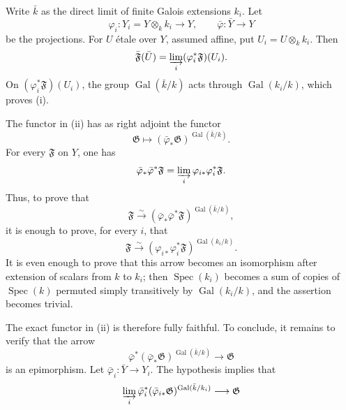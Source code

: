 Write $\bar k$ as the direct limit of finite Galois extensions $k_i$.
Let
\begin{equation*}
\varphi_i:Y_i=Y\otimes_k k_i\longrightarrow Y,
\qquad
\bar\varphi:\bar Y\longrightarrow Y
\end{equation*}
be the projections.  For $U$ \'{e}tale over $Y$, assumed affine, put
$U_i=U\otimes_k k_i$.  Then
\begin{equation*}
\bar{\mathfrak F}(\bar U)
=\varinjlim_i(\varphi_i^*\mathfrak F)(U_i).
\end{equation*}
On $(\varphi_i^*\mathfrak F)(U_i)$, the group
$\operatorname{Gal}(\bar k/k)$ acts through
$\operatorname{Gal}(k_i/k)$, which proves (i).

The functor in (ii) has as right adjoint the functor
\begin{equation*}
\mathfrak G\longmapsto
(\bar\varphi_*\mathfrak G)^{\operatorname{Gal}(\bar k/k)}.
\end{equation*}
For every $\mathfrak F$ on $Y$, one has
\begin{equation*}
\bar\varphi_*\bar\varphi^*\mathfrak F
=\varinjlim_i\varphi_{i*}\varphi_i^*\mathfrak F.
\end{equation*}
Thus, to prove that
\begin{equation*}
\mathfrak F\xrightarrow{\sim}
(\bar\varphi_*\bar\varphi^*\mathfrak F)^{
  \operatorname{Gal}(\bar k/k)},
\end{equation*}
it is enough to prove, for every $i$, that
\begin{equation*}
\mathfrak F\xrightarrow{\sim}
(\varphi_{i*}\varphi_i^*\mathfrak F)^{
  \operatorname{Gal}(k_i/k)}.
\end{equation*}
It is even enough to prove that this arrow becomes an isomorphism after
extension of scalars from $k$ to $k_i$; then $\operatorname{Spec}(k_i)$
becomes a sum of copies of $\operatorname{Spec}(k)$ permuted simply
transitively by $\operatorname{Gal}(k_i/k)$, and the assertion becomes
trivial.

The exact functor in (ii) is therefore fully faithful.  To conclude, it
remains to verify that the arrow
\begin{equation*}
\bar\varphi^*(\bar\varphi_*\mathfrak G)^{
  \operatorname{Gal}(\bar k/k)}\longrightarrow\mathfrak G
\end{equation*}
is an epimorphism.  Let $\bar\varphi_i:\bar Y\longrightarrow Y_i$.
The hypothesis implies that
\begin{equation*}
\varinjlim_i
\bar\varphi_i^*(\bar\varphi_{i*}\mathfrak G)^{
  \operatorname{Gal}(\bar k/k_i)}
\longrightarrow\mathfrak G
\end{equation*}


